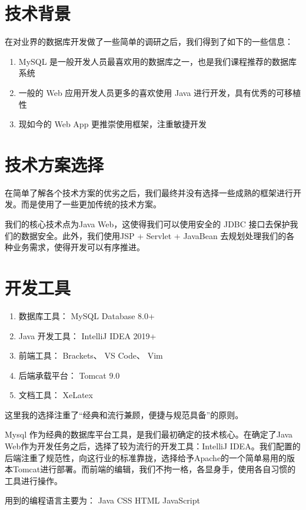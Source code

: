 \documentclass[../report.tex]{subfiles}
\begin{document}
\section{技术背景}

在对业界的数据库开发做了一些简单的调研之后，我们得到了如下的一些信息：

\begin{enumerate}
\itemsep -0.3em
\item MySQL 是一般开发人员最喜欢用的数据库之一，也是我们课程推荐的数据库系统
\item 一般的 Web 应用开发人员更多的喜欢使用 Java 进行开发，具有优秀的可移植性
\item 现如今的 Web App 更推崇使用框架，注重敏捷开发
\end{enumerate}

\section {技术方案选择}

在简单了解各个技术方案的优劣之后，我们最终并没有选择一些成熟的框架进行开发。而是使用了一些更加传统的技术方案。

我们的核心技术点为Java Web，这使得我们可以使用安全的 JDBC 接口去保护我们的数据安全。此外，我们使用JSP + Servlet + JavaBean 去规划处理我们的各种业务需求，使得开发可以有序推进。

\section{开发工具}

\begin{enumerate}
\itemsep -0.3em
\item 数据库工具： MySQL Database 8.0+
\item Java 开发工具： IntelliJ IDEA 2019+
\item 前端工具： Brackets、 VS Code、 Vim
\item 后端承载平台： Tomcat 9.0
\item 文档工具： XeLatex
\end{enumerate}

这里我的选择注重了“经典和流行兼顾，便捷与规范具备”的原则。

Mysql 作为经典的数据库平台工具，是我们最初确定的技术核心。在确定了Java Web作为开发任务之后，选择了较为流行的开发工具：IntelliJ IDEA。我们配置的后端注重了规范性，向这行业的标准靠拢，选择给予Apache的一个简单易用的版本Tomcat进行部署。而前端的编辑，我们不拘一格，各显身手，使用各自习惯的工具进行操作。

用到的编程语言主要为： Java CSS HTML JavaScript
\end{document}
